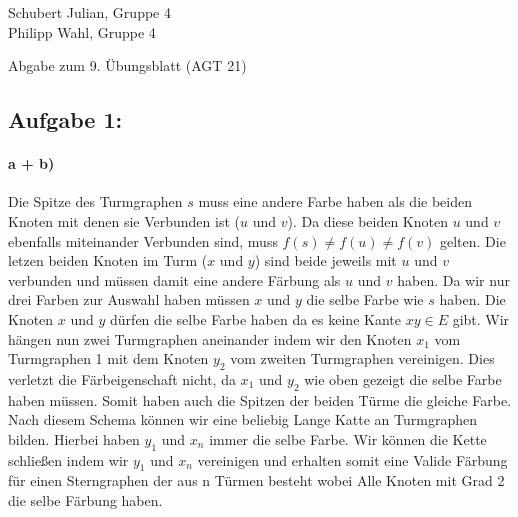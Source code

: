 \documentclass[a4paper]{article}
\begin{document}
\begin{small}
    \noindent
    Schubert Julian, Gruppe 4 \\
    Philipp Wahl, Gruppe 4
\end{small}
\bigskip

\begin{center}
    \LARGE Abgabe zum 9. Übungsblatt (AGT 21)
\end{center}
\smallskip
\subsection*{Aufgabe 1:}
\paragraph*{a + b)}
Die Spitze des Turmgraphen $s$ muss eine andere Farbe haben als die beiden Knoten mit
denen sie Verbunden ist ($u$ und $v$). Da diese beiden Knoten $u$ und $v$ ebenfalls
miteinander Verbunden sind, muss $f(s) \neq f(u) \neq f(v)$ gelten. Die letzen
beiden Knoten im Turm ($x$ und $y$) sind beide jeweils mit $u$ und $v$ verbunden
und müssen damit eine andere Färbung als $u$ und $v$ haben. Da wir nur drei 
Farben zur Auswahl haben müssen $x$ und $y$ die selbe Farbe wie $s$ haben.
Die Knoten $x$ und $y$ dürfen die selbe Farbe haben da es keine Kante $xy \in E$
gibt. Wir hängen nun zwei Turmgraphen aneinander indem wir den Knoten $x_1$ vom 
Turmgraphen 1 mit dem Knoten $y_2$ vom zweiten Turmgraphen vereinigen. Dies verletzt die 
Färbeigenschaft nicht, da $x_1$ und $y_2$ wie oben gezeigt die selbe Farbe haben
müssen. Somit haben auch die Spitzen der beiden Türme die gleiche Farbe. Nach diesem
Schema können wir eine beliebig Lange Katte an Turmgraphen bilden. Hierbei haben $y_1$
und $x_n$ immer die selbe Farbe. Wir können die Kette schließen indem wir $y_1$ und $x_n$
vereinigen und erhalten somit eine Valide Färbung für einen Sterngraphen der aus n Türmen
besteht wobei Alle Knoten mit Grad 2 die selbe Färbung haben.
\end{document}
